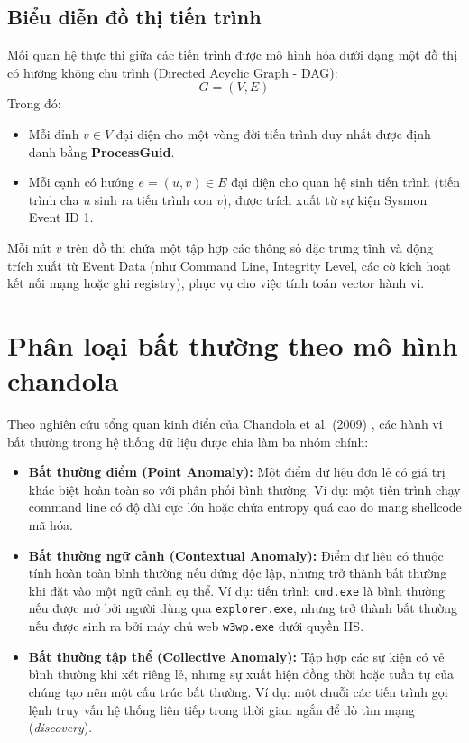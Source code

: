 ﻿\documentclass[../main.tex]{subfiles}
\begin{document}
\subsection{Biểu diễn đồ thị tiến trình}
\label{subsection:1.2.2}
Mối quan hệ thực thi giữa các tiến trình được mô hình hóa dưới dạng một đồ thị có hướng không chu trình (Directed Acyclic Graph - DAG):
\begin{equation}
    G = (V, E)
\end{equation}
Trong đó:
\begin{itemize}
    \item Mỗi đỉnh $v \in V$ đại diện cho một vòng đời tiến trình duy nhất được định danh bằng \textbf{ProcessGuid}.
    \item Mỗi cạnh có hướng $e = (u, v) \in E$ đại diện cho quan hệ sinh tiến trình (tiến trình cha $u$ sinh ra tiến trình con $v$), được trích xuất từ sự kiện Sysmon Event ID 1.
\end{itemize}
Mỗi nút $v$ trên đồ thị chứa một tập hợp các thông số đặc trưng tĩnh và động trích xuất từ Event Data (như Command Line, Integrity Level, các cờ kích hoạt kết nối mạng hoặc ghi registry), phục vụ cho việc tính toán vector hành vi.

\section{Phân loại bất thường theo mô hình chandola}
\label{section:1.3}
Theo nghiên cứu tổng quan kinh điển của Chandola et al. (2009) \cite{chandola2009anomaly}, các hành vi bất thường trong hệ thống dữ liệu được chia làm ba nhóm chính:
\begin{itemize}
    \item \textbf{Bất thường điểm (Point Anomaly):} Một điểm dữ liệu đơn lẻ có giá trị khác biệt hoàn toàn so với phân phối bình thường. Ví dụ: một tiến trình chạy command line có độ dài cực lớn hoặc chứa entropy quá cao do mang shellcode mã hóa.
    \item \textbf{Bất thường ngữ cảnh (Contextual Anomaly):} Điểm dữ liệu có thuộc tính hoàn toàn bình thường nếu đứng độc lập, nhưng trở thành bất thường khi đặt vào một ngữ cảnh cụ thể. Ví dụ: tiến trình \texttt{cmd.exe} là bình thường nếu được mở bởi người dùng qua \texttt{explorer.exe}, nhưng trở thành bất thường nếu được sinh ra bởi máy chủ web \texttt{w3wp.exe} dưới quyền IIS.
    \item \textbf{Bất thường tập thể (Collective Anomaly):} Tập hợp các sự kiện có vẻ bình thường khi xét riêng lẻ, nhưng sự xuất hiện đồng thời hoặc tuần tự của chúng tạo nên một cấu trúc bất thường. Ví dụ: một chuỗi các tiến trình gọi lệnh truy vấn hệ thống liên tiếp trong thời gian ngắn để dò tìm mạng (\textit{discovery}).
\end{itemize}
\end{document}

